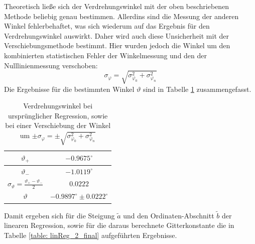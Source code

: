 \documentclass[a4paper, 11pt]{article}
\begin{document}
Theoretisch ließe sich der Verdrehungswinkel mit der oben beschriebenen Methode beliebig genau bestimmen. Allerdins sind die Messung der anderen Winkel fehlerbehaftet, was sich wiederum auf das Ergebnis für den Verdrehungswinkel auswirkt. Daher wird auch diese Unsicherheit mit der Verschiebungsmethode bestimmt. Hier wurden jedoch die Winkel um den kombinierten statistischen Fehler der Winkelmessung und den der Nulllinienmessung verschoben:
\begin{equation*}\label{eq:FehlerPhi}
\sigma_{\varphi} = \sqrt{\sigma_{\varphi_0}^2 + \sigma_{\varphi_n}^2}
\end{equation*}
Die Ergebnisse für die bestimmten Winkel $\vartheta$ sind in Tabelle \ref{table: theta} zusammengefasst.

\begin{table}[H]
	\renewcommand{\arraystretch}{1.5}
	\large
	\centering
	\begin{tabular}{|c|c|}
		\hline
		$\vartheta_+$	&	$ -0.9675^\circ $ \\
		\hline
		$\vartheta_-$	&	$ -1.0119^\circ $ \\
		\hline
		$\sigma_{\vartheta} = \frac{\vartheta_+ - \vartheta_-}{2}$	&	$ 0.0222 $ \\
		\hline
		$\vartheta$		&	$ -0.9897^\circ \pm 0.0222^\circ $	\\
		\hline
	\end{tabular}
	\caption{Verdrehungswinkel bei ursprünglicher Regression, sowie bei einer Verschiebung der Winkel um $\pm \sigma_{\varphi} = \pm \sqrt{\sigma_{\varphi_0}^2 + \sigma_{\varphi_n}^2} $}
	\label{table: theta}
\end{table}

Damit ergeben sich für die Steigung $\tilde{a}$ und den Ordinaten-Abschnitt $\tilde{b}$ der linearen Regression, sowie für die daraus berechnete Gitterkonstante die in Tabelle \ref{table: linReg_2_final} aufgeführten Ergebnisse.
\end{document}

